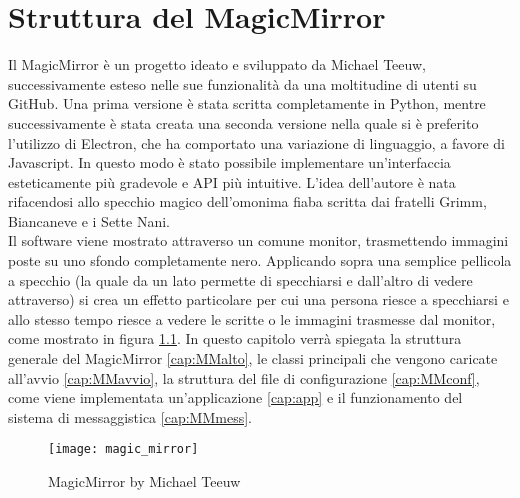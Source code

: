 \chapter{Struttura del MagicMirror}\label{capitolo3}
Il MagicMirror \`e un progetto ideato e sviluppato da Michael Teeuw, successivamente esteso nelle sue funzionalit\`a da una moltitudine di utenti su GitHub.
Una prima versione \`e stata scritta completamente in Python, mentre successivamente \`e stata creata una seconda versione nella quale si \`e preferito l'utilizzo di Electron,
che ha comportato una variazione di linguaggio, a favore di Javascript. In questo modo \`e stato possibile implementare un'interfaccia esteticamente pi\`u gradevole
e API pi\`u intuitive.
L'idea dell'autore \`e nata rifacendosi allo specchio magico dell'omonima fiaba
scritta dai fratelli Grimm, Biancaneve e i Sette Nani.\\
Il software viene mostrato attraverso un
comune monitor, trasmettendo immagini poste su uno sfondo completamente nero. Applicando sopra
una semplice pellicola a specchio (la quale da un lato permette di specchiarsi e dall'altro di vedere
attraverso) si crea un effetto particolare per cui una persona riesce a specchiarsi
e allo stesso tempo riesce a vedere le scritte o le immagini trasmesse dal monitor,
come mostrato in figura \ref{fig:MM}.
In questo capitolo verr\`a spiegata la struttura generale del MagicMirror \ref{cap:MMalto}, le classi principali che vengono caricate
all'avvio \ref{cap:MMavvio}, la struttura del file di configurazione \ref{cap:MMconf}, come viene implementata un'applicazione \ref{cap:app}
e il funzionamento del sistema di messaggistica \ref{cap:MMmess}.\\[2\baselineskip]
\begin{figure}[H]
    \texttt{[image: magic\_mirror]}
    \caption{MagicMirror by Michael Teeuw}
    \label{fig:MM}
\end{figure}

